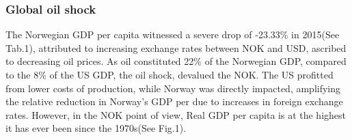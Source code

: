 \documentclass[11pt, a4paper]{article}
\begin{document}
			\subsubsection{Global oil shock}
				\vspace*{-4mm}
				The Norwegian GDP per capita witnessed a severe drop of -23.33\% in 2015(See Tab.1), attributed to increasing exchange rates between NOK and USD, ascribed to decreasing oil prices. As oil constituted 22\%\parencite{ecNorwayTradeEuropean2018} of the Norwegian GDP, compared to the 8\%\parencite{OilEconomy2019} of the US GDP, the oil shock, devalued the NOK. The US profitted from lower costs of production, while Norway was directly impacted, amplifying the relative reduction in Norway's GDP per due to increases in foreign exchange rates. However, in the NOK point of view, Real GDP per capita is at the highest it has ever been since the 1970s(See Fig.1).
				
\end{document}
